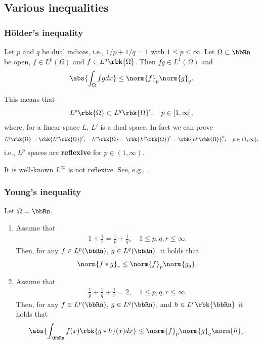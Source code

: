 \documentclass[openany, a4paper, oneside]{jsbook}
\begin{document}
\subsection{Various inequalities}

\subsubsection{H\"older's inequality}

\begin{thm}
 Let $p$ and $q$ be dual indices, i.e., $1/p + 1/q = 1$ with $1 \leq p \leq \infty$.
 Let $\Omega \subset \bbRn$ be open, $f \in L^p (\Omega)$ and $f \in L^q \rbk{\Omega}$.
 Then $fg \in L^1 (\Omega)$ and
 \begin{align}
  \abs{\int_{\Omega} fg dx}
  \leq
  \norm{f}_p \norm{g}_q.
 \end{align}
\end{thm}
This means that
\begin{align}
 L^p \rbk{\Omega} \subset L^q \rbk{\Omega}', \quad p \in [1, \infty],
\end{align}
where, for a linear space $L$, $L'$ is a dual space.
In fact we can prove
\begin{align}
 L^q \rbk{\Omega} = \rbk{L^p \rbk{\Omega}}', \quad
 L^p \rbk{\Omega} = \rbk{L^q \rbk{\Omega}}' = \rbk{L^p \rbk{\Omega}}'', \quad
 p \in (1, \infty),
\end{align}
i.e., $L^p$ spaces are \textbf{reflexive} for $p \in (1, \infty)$.

It is well-known $L^{\infty}$ is not reflexive.
See, e.g., \cite{HaimBrezis1, HaimBrezis2}.
\subsubsection{Young's inequality}

\begin{thm}\label{Lieb-Loss_Analysis_chap11_37}
 Let $\Omega = \bbRn$.
\begin{enumerate}
\item Assume that
\begin{align}
 1 + \frac{1}{r} = \frac{1}{p} + \frac{1}{q}, \quad 1 \leq p, q, r \leq \infty.
\end{align}
Then, for any $f \in L^p (\bbRn)$, $g \in L^q (\bbRn)$, it holds that
\begin{align}
 \norm{f * g}_r
 \leq
 \norm{f}_p \norm{g_q}.
\end{align}
\item Assume that
\begin{align}
  \frac{1}{p} + \frac{1}{q} + \frac{1}{r} = 2, \quad 1 \leq p, q, r \leq \infty.
\end{align}
Then, for any $f \in L^p (\bbRn)$, $g \in L^q (\bbRn)$, and $h \in L^r \rbk{\bbRn}$ it holds that
\begin{align}
 \abs{\int_{\bbRn} f (x) \rbk{g * h} (x) dx}
 \leq
 \norm{f}_p \norm{g}_q \norm{h}_r.
\end{align}
\end{enumerate}
\end{thm}
\end{document}
